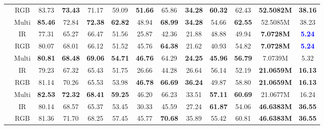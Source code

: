 \begin{table*}[htpb]
{\begin{tabular}{c|c|c|c|c|c|c|c|c|c|c|c|c}
		& RGB        & 83.73          & \textbf{73.43} & 71.17          & 59.09          & \textbf{51.66} & 65.86          & \textbf{34.28} & \textbf{60.32} & 62.43         &\textbf{52.5082M} &\textbf{38.16} \\
		& Multi & \textbf{85.46} & 72.84          & \textbf{72.38} & \textbf{62.82} & 48.94          & \textbf{68.99} & \textbf{34.28} & 54.66          & \textbf{62.55} & 52.5085M  & 38.23 \\
		\midrule
		\textbf{\multirow{3}{*}{YOLOv5s \cite{yolov5}}} & IR         & 77.31          & 65.27          & 66.47          & 51.56          & 25.87          & 42.36          & 21.88          & 48.88          & 49.94       & \textbf{7.0728M}  & \textbf{\textcolor{blue}{5.24}}   \\
		& RGB        & 80.07          & 68.01          & 66.12          & 51.52          & 45.76          & \textbf{64.38} & 21.62          & 40.93          & 54.82          & \textbf{7.0728M}  & \textbf{\textcolor{blue}{5.24}} \\
		& Multi & \textbf{80.81} & \textbf{68.48} & \textbf{69.06} & \textbf{54.71} & \textbf{46.76} & 64.29          & \textbf{24.25} & \textbf{45.96} & \textbf{56.79} & 7.0739M        & 5.32 \\
		\midrule
		\textbf{\multirow{3}{*}{YOLOv5m \cite{yolov5}} }& IR         & 79.23          & 67.32          & 65.43          & 51.75          & 26.66          & 44.28          & 26.64          & 56.14          & 52.19    &\textbf{21.0659M} &\textbf{16.13}      \\
		& RGB        & 81.14          & 70.26          & 65.53          & 53.98          & \textbf{46.78} & \textbf{66.69} & \textbf{36.24} & 49.87          & 58.80     &\textbf{21.0659M} &\textbf{16.13}     \\
		& Multi & \textbf{82.53} & \textbf{72.32} & \textbf{68.41} & \textbf{59.25} & 46.20          & 66.23          & 33.51          & \textbf{57.11} & \textbf{60.69}  & 21.0677M  & 16.24 \\
		\midrule
		\textbf{\multirow{3}{*}{YOLOv5l \cite{yolov5}}} & IR         & 80.14          & 68.57          & 65.37          & 53.45          & 30.33          & 45.59          & 27.24          & \textbf{61.87} & 54.06     &\textbf{46.6383M} &\textbf{36.55}     \\
		& RGB        & 81.36          & 71.70          & 68.25          & 57.45          & 45.77          & \textbf{70.68} & 35.89          & 55.42          & 60.81    &\textbf{46.6383M} &\textbf{36.55}      \\

\end{tabular}}
\end{table*}
